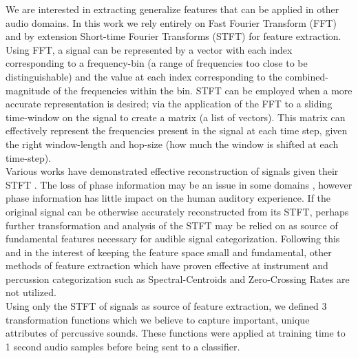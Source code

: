 \documentclass{nime-alternate} %
\begin{document}
We are interested in extracting generalize features that can be applied in other audio domains. In this work we rely entirely on Fast Fourier Transform (FFT) and by extension Short-time Fourier Transforms (STFT) for feature extraction. Using FFT, a signal can be represented by a vector with each index corresponding to a frequency-bin (a range of frequencies too close to be distinguishable) and the value at each index corresponding to the combined-magnitude of the frequencies within the bin. STFT can be employed when a more accurate representation is desired; via the application of the FFT to a sliding time-window on the signal to create a matrix (a list of vectors). This matrix can effectively represent the frequencies present in the signal at each time step, given the right window-length and hop-size (how much the window is shifted at each time-step).\\
Various works have demonstrated effective reconstruction of signals given their STFT \cite{nawab1983signal,griffin1984signal}. The loss of phase information may be an issue in some domains \cite{sturmel2011signal}, however phase information has little impact on the human auditory experience. If the original signal can be otherwise accurately reconstructed from its STFT, perhaps further transformation and analysis of the STFT may be relied on as source of fundamental features necessary for audible signal categorization. Following this and in the interest of keeping the feature space small and fundamental, other methods of feature extraction which have proven effective at instrument and percussion categorization such as Spectral-Centroids \cite{schubert2004spectral} and Zero-Crossing Rates \cite{gouyon2000use} are not utilized.\\
Using only the STFT of signals as source of feature extraction, we defined 3 transformation functions which we believe to capture important, unique attributes of percussive sounds. These functions were applied at training time to 1 second audio samples before being sent to a classifier. 
\end{document}
